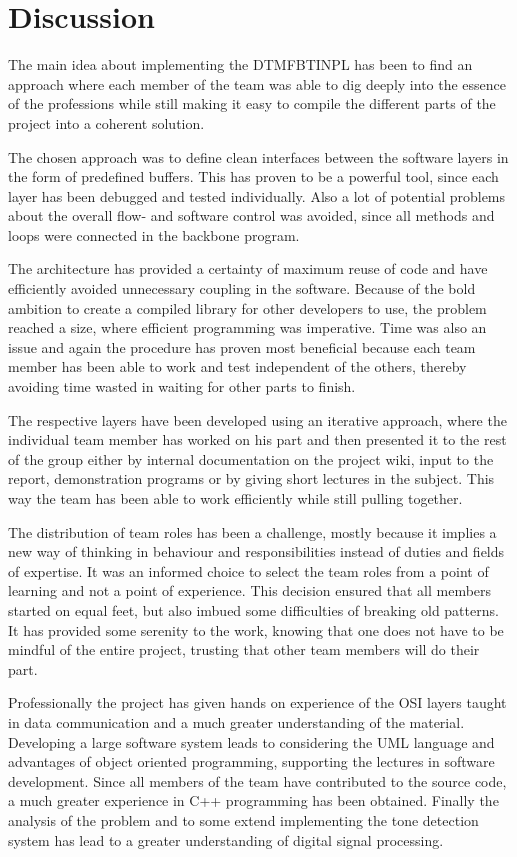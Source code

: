 \chapter{Discussion}\label{chap:discussion}
The main idea about implementing the DTMFBTINPL has been to find an approach
where each member of the team was able to dig deeply into the essence of the
professions while still making it easy to compile the different parts of the
project into a coherent solution.

The chosen approach was to define clean interfaces between the software layers
in the form of predefined buffers. This has proven to be a powerful tool, since
each layer has been debugged and tested individually. Also a lot of potential
problems about the overall flow- and software control was avoided, since all
methods and loops were connected in the backbone program.

The architecture has provided a certainty of maximum reuse of
code and have efficiently avoided unnecessary coupling in the software. Because
of the bold ambition to create a compiled library for other developers to use, the problem reached a
size, where efficient programming was imperative. Time was also an issue and
again the procedure has proven most beneficial because each team member has been
able to work and test independent of the others, thereby avoiding time wasted in
waiting for other parts to finish.

The respective layers have been developed using an iterative approach, where
the individual team member has worked on his part and then presented it to the rest
of the group either by internal documentation on the project wiki, input to the
report, demonstration programs or by giving short lectures in the subject. This
way the team has been able to work efficiently while still pulling together.

The distribution of team roles has been a challenge, mostly because it implies a
new way of thinking in behaviour and responsibilities instead of duties and
fields of expertise. It was an informed choice to select the team roles from a
point of learning and not a point of experience. This decision ensured that
all members started on equal feet, but also imbued some difficulties of breaking
old patterns. It has provided some serenity to the work, knowing that one does
not have to be mindful of the entire project, trusting that other team members
will do their part.

Professionally the project has given hands on experience of the OSI layers
taught in data communication and a much greater understanding of the material.
Developing a large software system leads to considering the UML language and
advantages of object oriented programming, supporting the lectures in software
development. Since all members of the team have contributed to the source code,
a much greater experience in C++ programming has been obtained. Finally the
analysis of the problem and to some extend implementing the tone detection
system has lead to a greater understanding of digital signal processing.
